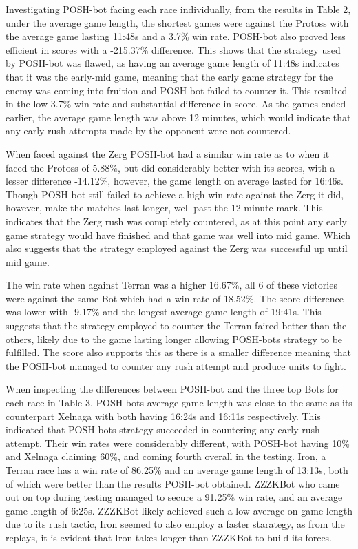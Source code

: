 \documentclass[journal]{IEEEtran}
\begin{document}
	Investigating POSH-bot facing each race individually, from the results in Table 2, under the average game length, the shortest games were against the Protoss with the average game lasting 11:48s and a 3.7\% win rate. POSH-bot also proved less efficient in scores with a -215.37\% difference. This shows that the strategy used by POSH-bot was flawed, as having an average game length of 11:48s indicates that it was the early-mid game, meaning that the early game strategy for the enemy was coming into fruition and POSH-bot failed to counter it. This resulted in the low 3.7\% win rate and substantial difference in score. As the games ended earlier, the average game length was above 12 minutes, which would indicate that any early rush attempts made by the opponent were not countered.
	
	When faced against the Zerg POSH-bot had a similar win rate as to when it faced the Protoss of 5.88\%, but did considerably better with its scores, with a lesser difference -14.12\%, however, the game length on average lasted for 16:46s. Though POSH-bot still failed to achieve a high win rate against the Zerg it did, however, make the matches last longer, well past the 12-minute mark. This indicates that the Zerg rush was completely countered, as at this point any early game strategy would have finished and that game was well into mid game. Which also suggests that the strategy employed against the Zerg was successful up until mid game.
	
	The win rate when against Terran was a higher 16.67\%, all 6 of these victories were against the same Bot which had a win rate of 18.52\%. The score difference was lower with -9.17\% and the longest average game length of 19:41s. This suggests that the strategy employed to counter the Terran faired better than the others, likely due to the game lasting longer allowing POSH-bots strategy to be fulfilled. The score also supports this as there is a smaller difference meaning that the POSH-bot managed to counter any rush attempt and produce units to fight.
	
	When inspecting the differences between POSH-bot and the three top Bots for each race in Table 3, POSH-bots average game length was close to the same as its counterpart Xelnaga with both having 16:24s and 16:11s respectively. This indicated that POSH-bots strategy succeeded in countering any early rush attempt. Their win rates were considerably different, with POSH-bot having 10\% and Xelnaga claiming 60\%, and coming fourth overall in the testing. Iron, a Terran race has a win rate of 86.25\% and an average game length of 13:13s, both of which were better than the results POSH-bot obtained. ZZZKBot who came out on top during testing managed to secure a 91.25\% win rate, and an average game length of 6:25s. ZZZKBot likely achieved such a low average on game length due to its rush tactic, Iron seemed to also employ a faster starategy, as from the replays, it is evident that Iron takes longer than ZZZKBot to build its forces.
	
\end{document}
